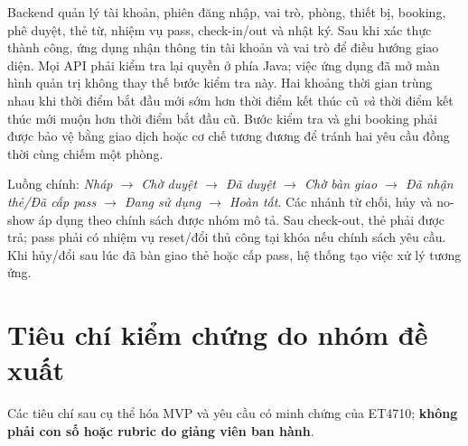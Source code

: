 \documentclass[12pt,a4paper]{article}
\begin{document}
Backend quản lý tài khoản, phiên đăng nhập, vai trò, phòng, thiết bị, booking, phê duyệt, thẻ từ, nhiệm vụ pass, check-in/out và nhật ký. Sau khi xác thực thành công, ứng dụng nhận thông tin tài khoản và vai trò để điều hướng giao diện. Mọi API phải kiểm tra lại quyền ở phía Java; việc ứng dụng đã mở màn hình quản trị không thay thế bước kiểm tra này. Hai khoảng thời gian trùng nhau khi thời điểm bắt đầu mới sớm hơn thời điểm kết thúc cũ \emph{và} thời điểm kết thúc mới muộn hơn thời điểm bắt đầu cũ. Bước kiểm tra và ghi booking phải được bảo vệ bằng giao dịch hoặc cơ chế tương đương để tránh hai yêu cầu đồng thời cùng chiếm một phòng.

Luồng chính: \emph{Nháp $\rightarrow$ Chờ duyệt $\rightarrow$ Đã duyệt $\rightarrow$ Chờ bàn giao $\rightarrow$ Đã nhận thẻ/Đã cấp pass $\rightarrow$ Đang sử dụng $\rightarrow$ Hoàn tất}. Các nhánh từ chối, hủy và no-show áp dụng theo chính sách được nhóm mô tả. Sau check-out, thẻ phải được trả; pass phải có nhiệm vụ reset/đổi thủ công tại khóa nếu chính sách yêu cầu. Khi hủy/đổi sau lúc đã bàn giao thẻ hoặc cấp pass, hệ thống tạo việc xử lý tương ứng.

\section{Tiêu chí kiểm chứng do nhóm đề xuất}

Các tiêu chí sau cụ thể hóa MVP và yêu cầu có minh chứng của ET4710; \textbf{không phải con số hoặc rubric do giảng viên ban hành}.
\end{document}
